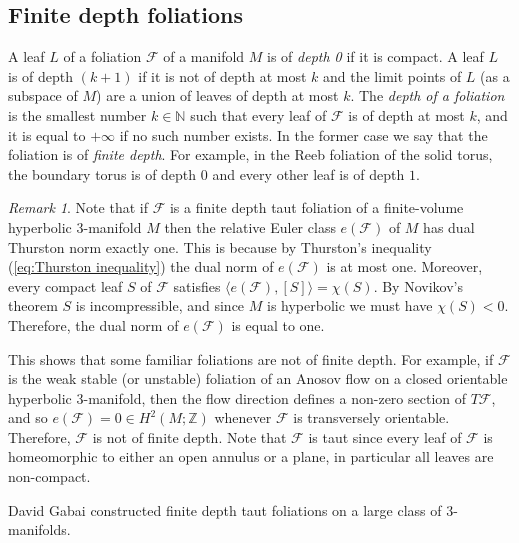 \documentclass[11pt]{amsart}
\theoremstyle{remark}
\newtheorem{remark}[thm]{Remark}
\theoremstyle{definition}
\begin{document}
	\subsection{Finite depth foliations}
	
	A leaf $L$ of a foliation $\mathcal{F}$ of a manifold $M$ is of \emph{depth 0} if it is compact. A leaf $L$ is of depth $(k+1)$ if it is not of depth at most $k$ and the limit points of $L$ (as a subspace of $M$) are a union of leaves of depth at most $k$. The \emph{depth of a foliation} is the smallest number $k \in \mathbb{N}$ such that every leaf of $\mathcal{F}$ is of depth at most $k$, and it is equal to $+ \infty$ if no such number exists. In the former case we say that the foliation is of \emph{finite depth}. 
	For example, in the Reeb foliation of the solid torus, the boundary torus is of depth $0$ and every other leaf is of depth $1$.  

	\begin{remark}
		Note that if $\mathcal{F}$ is a finite depth taut foliation of a finite-volume hyperbolic 3-manifold $M$ then the relative Euler class $e(\mathcal{F})$ of $M$ has dual Thurston norm exactly one. This is because by Thurston's inequality (\ref{eq:Thurston inequality}) the dual norm of $e(\mathcal{F})$ is at most one. Moreover, every compact leaf $S$ of $\mathcal{F}$ satisfies $ \langle e(\mathcal{F}) , [S] \rangle  = \chi(S)$. By Novikov's theorem $S$ is incompressible, and since $M$ is hyperbolic we must have $\chi(S)<0$. Therefore, the dual norm of $e(\mathcal{F})$ is equal to one. 
		
		This shows that some familiar foliations are not of finite depth. For example, if $\mathcal{F}$ is the weak stable (or unstable) foliation of an Anosov flow on a closed orientable hyperbolic 3-manifold, then the flow direction defines a non-zero section of $T \mathcal{F}$, and so $e(\mathcal{F}) = 0 \in H^2(M ; \mathbb{Z})$ whenever $\mathcal{F}$ is transversely orientable. Therefore, $\mathcal{F}$ is not of finite depth. Note that $\mathcal{F}$ is taut since every leaf of $\mathcal{F}$ is homeomorphic to either an open annulus or a plane, in particular all leaves are non-compact. 
	\end{remark}

	David Gabai \cite{gabai1983foliations} constructed finite depth taut foliations on a large class of 3-manifolds. 
\end{document}
